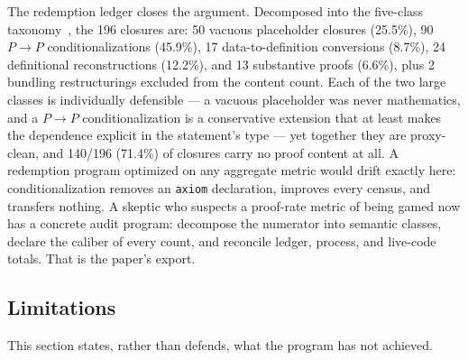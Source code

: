 The redemption ledger closes the argument. Decomposed into the
five-class taxonomy~\cite{sylvap0recon2026}, the 196 closures are: 50 vacuous placeholder
closures (25.5\%), 90 $P\!\to\!P$ conditionalizations (45.9\%),
17 data-to-definition conversions (8.7\%), 24 definitional
reconstructions (12.2\%), and 13 substantive proofs (6.6\%), plus
2 bundling restructurings excluded from the content count. Each of
the two large classes is individually defensible --- a vacuous
placeholder was never mathematics, and a $P\!\to\!P$
conditionalization is a conservative extension that at least
makes the dependence explicit in the statement's type --- yet
together they are proxy-clean, and 140/196 (71.4\%) of closures
carry no proof content at all. A redemption program optimized on
any aggregate metric would drift exactly here: conditionalization
removes an \texttt{axiom} declaration, improves every census, and
transfers nothing. A skeptic who suspects a proof-rate metric of
being gamed now has a concrete audit program: decompose the
numerator into semantic classes, declare the caliber of every
count, and reconcile ledger, process, and live-code totals. That
is the paper's export.

\subsection{Limitations}
\label{sec:limitations}
This section states, rather than defends, what the program has
not achieved.

